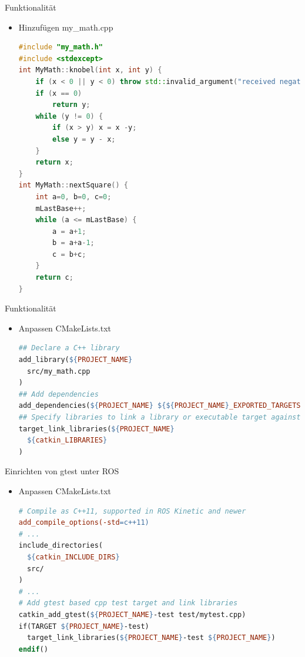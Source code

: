 \documentclass{beamer}
\begin{document}
\begin{frame}[fragile]{Funktionalität}
\begin{itemize}
\item Hinzufügen my\_math.cpp
\begin{lstlisting}[language=c++]
#include "my_math.h"
#include <stdexcept>
int MyMath::knobel(int x, int y) {
	if (x < 0 || y < 0) throw std::invalid_argument("received negative value");
	if (x == 0)
		return y;
	while (y != 0) {
		if (x > y) x = x -y;
		else y = y - x;
	}
	return x;
}
int MyMath::nextSquare() {
	int a=0, b=0, c=0;
	mLastBase++;
	while (a <= mLastBase) {
		a = a+1;
		b = a+a-1;
		c = b+c;
	}
	return c;
}
\end{lstlisting}
\end{itemize}
\end{frame}

\begin{frame}[fragile]{Funktionalität}
\begin{itemize}
\item Anpassen CMakeLists.txt
\begin{lstlisting}[language=make]
## Declare a C++ library
add_library(${PROJECT_NAME}
  src/my_math.cpp
)
## Add dependencies
add_dependencies(${PROJECT_NAME} ${${PROJECT_NAME}_EXPORTED_TARGETS} ${catkin_EXPORTED_TARGETS})
## Specify libraries to link a library or executable target against
target_link_libraries(${PROJECT_NAME}
  ${catkin_LIBRARIES}
)
\end{lstlisting}
\end{itemize}
\end{frame}

\begin{frame}[fragile]{Einrichten von gtest unter ROS}
\begin{itemize}
\item Anpassen CMakeLists.txt
\begin{lstlisting}[language=make]
# Compile as C++11, supported in ROS Kinetic and newer
add_compile_options(-std=c++11)
# ...
include_directories(
  ${catkin_INCLUDE_DIRS}
  src/
)
# ...
# Add gtest based cpp test target and link libraries
catkin_add_gtest(${PROJECT_NAME}-test test/mytest.cpp)
if(TARGET ${PROJECT_NAME}-test)
  target_link_libraries(${PROJECT_NAME}-test ${PROJECT_NAME})
endif()
\end{lstlisting}
\end{itemize}
\end{frame}
\end{document}
